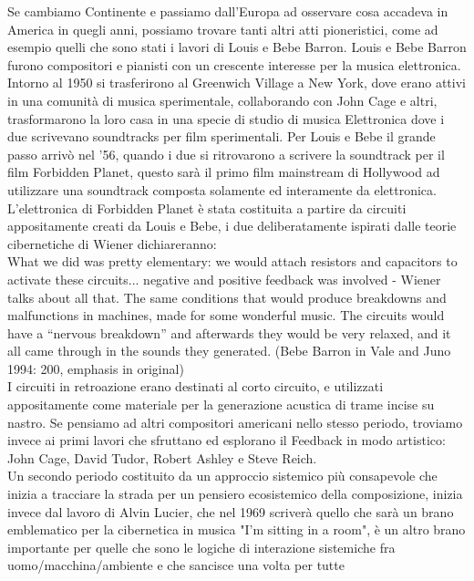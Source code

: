 Se cambiamo Continente e passiamo dall'Europa ad osservare cosa accadeva
in America in quegli anni, possiamo trovare tanti altri atti pioneristici,
come ad esempio quelli che sono stati i lavori di Louis e Bebe Barron.
Louis e Bebe Barron furono compositori e pianisti
con un crescente interesse per la
musica elettronica.
Intorno al 1950 si trasferirono
al Greenwich Village a New York, dove erano attivi in ​​una comunità
di musica sperimentale, collaborando con John Cage e altri,
trasformarono la loro casa in una specie di studio di musica Elettronica
dove i due scrivevano soundtracks per film sperimentali.
Per Louis e Bebe il grande passo arrivò nel
'56, quando i due si ritrovarono a scrivere la soundtrack per il film
Forbidden Planet,
questo sarà il primo film mainstream di Hollywood ad utilizzare una soundtrack
composta solamente ed interamente da elettronica.
L'elettronica di Forbidden Planet è stata
costituita a partire da circuiti appositamente creati da Louis e Bebe,
i due deliberatamente ispirati dalle teorie cibernetiche di Wiener
dichiareranno:
\\
What we did was pretty elementary: we would attach resistors and capacitors
to activate these
circuits... negative and positive feedback was involved - Wiener
talks about all that. The same
conditions that would produce breakdowns and malfunctions in machines,
made for some
wonderful music. The circuits would have a “nervous breakdown”
and afterwards they would be
very relaxed, and it all came through in the sounds they generated.
(Bebe Barron in Vale and Juno 1994: 200, emphasis in original)
\\
I circuiti in retroazione erano destinati al corto circuito,
e utilizzati appositamente come materiale per la generazione acustica
di trame incise su nastro.
Se pensiamo ad altri compositori americani nello stesso periodo,
troviamo invece ai primi lavori che sfruttano
ed esplorano il Feedback in modo artistico:
John Cage, David Tudor, Robert Ashley e Steve Reich. \\
Un secondo periodo costituito da un approccio sistemico più consapevole
che inizia a tracciare la strada per un pensiero ecosistemico della composizione,
inizia invece dal lavoro
di Alvin Lucier, che nel 1969 scriverà quello che sarà un brano emblematico per
la cibernetica in musica "I'm sitting in a room",
è un altro brano importante per quelle che sono
le logiche di interazione sistemiche fra uomo/macchina/ambiente
e che sancisce una volta per tutte

